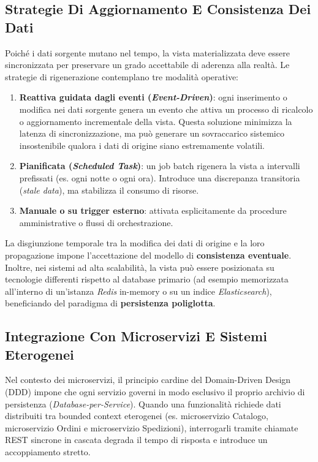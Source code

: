 \documentclass[11pt, a4paper]{article}
\begin{document}
\subsection{Strategie Di Aggiornamento E Consistenza Dei Dati}

Poiché i dati sorgente mutano nel tempo, la vista materializzata deve essere sincronizzata per preservare un grado accettabile di aderenza alla realtà. Le strategie di rigenerazione contemplano tre modalità operative:
\begin{enumerate}
    \item \textbf{Reattiva guidata dagli eventi (\emph{Event-Driven})}: ogni inserimento o modifica nei dati sorgente genera un evento che attiva un processo di ricalcolo o aggiornamento incrementale della vista. Questa soluzione minimizza la latenza di sincronizzazione, ma può generare un sovraccarico sistemico insostenibile qualora i dati di origine siano estremamente volatili.
    \item \textbf{Pianificata (\emph{Scheduled Task})}: un job batch rigenera la vista a intervalli prefissati (es. ogni notte o ogni ora). Introduce una discrepanza transitoria (\emph{stale data}), ma stabilizza il consumo di risorse.
    \item \textbf{Manuale o su trigger esterno}: attivata esplicitamente da procedure amministrative o flussi di orchestrazione.
\end{enumerate}

La disgiunzione temporale tra la modifica dei dati di origine e la loro propagazione impone l'accettazione del modello di \textbf{consistenza eventuale}. Inoltre, nei sistemi ad alta scalabilità, la vista può essere posizionata su tecnologie differenti rispetto al database primario (ad esempio memorizzata all'interno di un'istanza \emph{Redis} in-memory o su un indice \emph{Elasticsearch}), beneficiando del paradigma di \textbf{persistenza poliglotta}.

\subsection{Integrazione Con Microservizi E Sistemi Eterogenei}

Nel contesto dei microservizi, il principio cardine del Domain-Driven Design (DDD) impone che ogni servizio governi in modo esclusivo il proprio archivio di persistenza (\emph{Database-per-Service}). Quando una funzionalità richiede dati distribuiti tra bounded context eterogenei (es. microservizio Catalogo, microservizio Ordini e microservizio Spedizioni), interrogarli tramite chiamate REST sincrone in cascata degrada il tempo di risposta e introduce un accoppiamento stretto.
\end{document}
